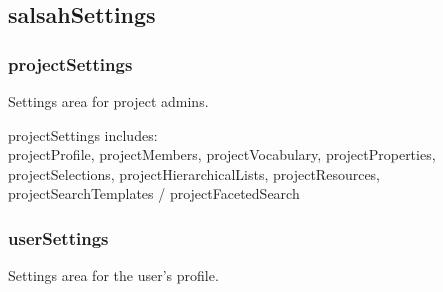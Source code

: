 \subsection{salsahSettings}
\subsubsection{projectSettings}
Settings area for project admins. 

projectSettings includes:\\
projectProfile, projectMembers, projectVocabulary, projectProperties, projectSelections, projectHierarchicalLists, projectResources, projectSearchTemplates / projectFacetedSearch


\subsubsection{userSettings}
Settings area for the user's profile.
